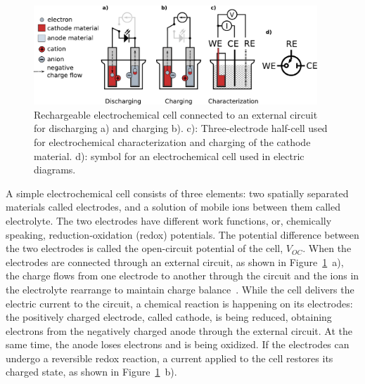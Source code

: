 \begin{figure}[h]
\center
	\includegraphics[width=0.95\textwidth]{./electrochemistry/figures/echem_cells.pdf}
	\caption{Rechargeable electrochemical cell connected to an external circuit for discharging a) and charging b). c): Three-electrode half-cell used for electrochemical characterization and charging of the cathode material. d): symbol for an electrochemical cell used in electric diagrams.}
	\label{fig:echem_cells}
\end{figure}

A simple electrochemical cell consists of three elements: two spatially separated materials called electrodes, and a solution of mobile ions between them called electrolyte. The two electrodes have different work functions, or, chemically speaking, reduction-oxidation (redox) potentials. The potential difference between the two electrodes is called the open-circuit potential of the cell, $V_{OC}$. When the electrodes are connected through an external circuit, as shown in Figure~\ref{fig:echem_cells}~a), the charge flows from one electrode to another through the circuit and the ions in the electrolyte rearrange to maintain charge balance~\cite{muench2016_chemrev}. While the cell delivers the electric current to the circuit, a chemical reaction is happening on its electrodes: the positively charged electrode, called cathode, is being reduced, obtaining electrons from the negatively charged anode through the external circuit. At the same time, the anode loses electrons and is being oxidized. If the electrodes can undergo a reversible redox reaction, a current applied to the cell restores its charged state, as shown in Figure~\ref{fig:echem_cells}~b).\\

